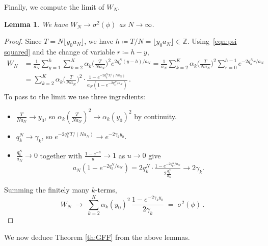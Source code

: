 \documentclass[11pt,a4paper,reqno]{amsart}
\newtheorem{Lemma}[Theorem]{Lemma}
\theoremstyle{definition}
\newcommand{\bbZ}{{\ensuremath{\mathbb Z}} }
\begin{document}
Finally, we compute the limit of $W_N$.
\begin{Lemma}
\label{clm:W to sigma}
We have $W_N \to \sigma^2(\phi)$ as $N \to \infty$.
\end{Lemma}
\begin{proof}
Since $T = N \lfloor y_0 a_N\rfloor$, we have $h \coloneqq T/N = \lfloor y_0 a_N\rfloor \in \bbZ$. Using~\eqref{eqn:psi squared} and the change of variable $r \coloneqq h - y$,
\begin{align}
W_N & = \frac{1}{a_N} \sum_{y=1}^{h} \sum_{k=2}^K \alpha_k \!\big( \tfrac{T}{N a_N} \big)^2 e^{2 q_k^N ( y - h) /a_N  }
= \frac{1}{a_N} \sum_{k=2}^K \alpha_k \!\big( \tfrac{T}{N a_N} \big)^2   \sum_{r=0}^{h - 1} e^{-2 q_k^N r / a_N }
\nonumber \\
& = \sum_{k=2}^K \alpha_k\!\big( \tfrac{T}{N a_N} \big)^2 \cdot \frac{ 1 - e^{-2 q_k^N T/(N a_N) } }{ a_N( 1 - e^{-2 q_k^N / a_N} ) }\,.
\label{eqn:W to sigma}
\end{align}
To pass to the limit we use three ingredients: 
\begin{itemize}
\item $\tfrac{T}{Na_N} \to y_0$, so $\alpha_k(\tfrac{T}{Na_N})^2 \to \alpha_k(y_0)^2$ by continuity. 
\item $q_k^N \to \gamma_k$, so $e^{-2 q_k^N T/(Na_N)} \to e^{-2 \gamma_k y_0}$. 
\item $\tfrac{q_k^N}{a_N} \to 0$ together with $\tfrac{1 - e^{-u}}{u} \to 1$ as $u \to 0$ give 
$$ a_N(1 - e^{-2 q_k^N/a_N}) = 2 q_k^N \cdot \tfrac{1 - e^{-2 q_k^N/a_N}}{2 \tfrac{q_k^N}{a_N} } \to 2 \gamma_k . $$ 
\end{itemize}
Summing the finitely many $k$-terms,
\[
  W_N \;\to\; \sum_{k=2}^K \alpha_k(y_0)^2\,\frac{1 - e^{-2 \gamma_k y_0}}{2 \gamma_k} \;=\; \sigma^2(\phi)\,.
\]
\end{proof}



We now deduce Theorem \ref{th:GFF} from the above lemmas.
\end{document}

